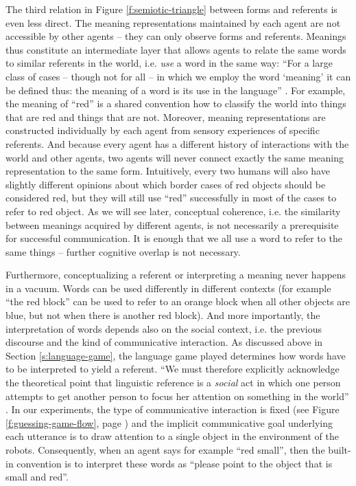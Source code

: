 The third relation in Figure \ref{f:semiotic-triangle} between forms
and referents is even less direct. The meaning representations
maintained by each agent are not accessible by other agents -- they
can only observe forms and referents. Meanings thus constitute an
intermediate layer that allows agents to relate the same words to
similar referents in the world, i.e. \emph{use} a word in the same
way: ``For a large class of cases -- though not for all -- in which we
employ the word `meaning' it can be defined thus: the meaning of a
word is its use in the language'' \citep[Part I, Section
43]{wittgenstein67philosophische}. For example, the meaning of ``red''
is a shared convention how to classify the world into things that are
red and things that are not. Moreover, meaning representations are
constructed individually by each agent from sensory experiences of
specific referents. And because every agent has a different history of
interactions with the world and other agents, two agents will never
connect exactly the same meaning representation to the same
form. Intuitively, every two humans will also have slightly different
opinions about which border cases of red objects should be considered
red, but they will still use ``red'' successfully in most of the cases
to refer to red object. As we will see later, conceptual coherence,
i.e. the similarity between meanings acquired by different agents, is
not necessarily a prerequisite for successful communication. It is
enough that we all use a word to refer to the same things -- further
cognitive overlap is not necessary.


Furthermore, conceptualizing a referent or interpreting a meaning
never happens in a vacuum. Words can be used differently in different
contexts (for example ``the red block'' can be used to refer to an
orange block when all other objects are blue, but not when there is
another red block). And more importantly, the interpretation of words
depends also on the social context, i.e. the previous discourse and
the kind of communicative interaction. As discussed above in Section
\ref{s:language-game}, the language game played determines how words
have to be interpreted to yield a referent. ``We must therefore
explicitly acknowledge the theoretical point that linguistic reference
is a \emph{social} act in which one person attempts to get another
person to focus her attention on something in the world''
\citep[p. 97]{tomasello99cultural}. In our experiments, the type of
communicative interaction is fixed (see Figure
\ref{f:guessing-game-flow}, page \pageref{f:guessing-game-flow}) and
the implicit communicative goal underlying each utterance is to draw
attention to a single object in the environment of the
robots. Consequently, when an agent says for example ``red small'',
then the built-in convention is to interpret these words as ``please
point to the object that is small and red''.


